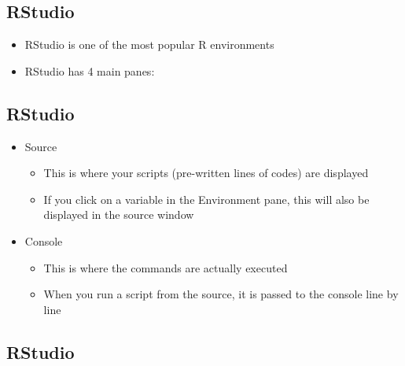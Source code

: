 \documentclass[]{article}
\providecommand{\tightlist}{%
  \setlength{\itemsep}{0pt}\setlength{\parskip}{0pt}}
\begin{document}
\subsection{RStudio}\label{rstudio}

\begin{itemize}
\tightlist
\item
  RStudio is one of the most popular R environments
\item
  RStudio has 4 main panes:
\end{itemize}

\subsection{RStudio}\label{rstudio-1}

\begin{itemize}
\tightlist
\item
  Source

  \begin{itemize}
  \tightlist
  \item
    This is where your scripts (pre-written lines of codes) are
    displayed
  \item
    If you click on a variable in the Environment pane, this will also
    be displayed in the source window
  \end{itemize}
\item
  Console

  \begin{itemize}
  \tightlist
  \item
    This is where the commands are actually executed
  \item
    When you run a script from the source, it is passed to the console
    line by line
  \end{itemize}
\end{itemize}

\subsection{RStudio}\label{rstudio-2}
\end{document}
